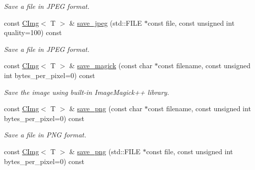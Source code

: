 \begin{DoxyCompactItemize}
\begin{DoxyCompactList}\small\item\em Save a file in JPEG format. \item\end{DoxyCompactList}\item 
\hypertarget{structcimg__library_1_1CImg_a9202a53f114a0a4231b41af4ea432bf1}{
const \hyperlink{structcimg__library_1_1CImg}{CImg}$<$ T $>$ \& \hyperlink{structcimg__library_1_1CImg_a9202a53f114a0a4231b41af4ea432bf1}{save\_\-jpeg} (std::FILE $\ast$const file, const unsigned int quality=100) const }
\label{structcimg__library_1_1CImg_a9202a53f114a0a4231b41af4ea432bf1}

\begin{DoxyCompactList}\small\item\em Save a file in JPEG format. \item\end{DoxyCompactList}\item 
\hypertarget{structcimg__library_1_1CImg_ac770a70466ad46bd7c2fd6c604974b6c}{
const \hyperlink{structcimg__library_1_1CImg}{CImg}$<$ T $>$ \& \hyperlink{structcimg__library_1_1CImg_ac770a70466ad46bd7c2fd6c604974b6c}{save\_\-magick} (const char $\ast$const filename, const unsigned int bytes\_\-per\_\-pixel=0) const }
\label{structcimg__library_1_1CImg_ac770a70466ad46bd7c2fd6c604974b6c}

\begin{DoxyCompactList}\small\item\em Save the image using built-\/in ImageMagick++ library. \item\end{DoxyCompactList}\item 
\hypertarget{structcimg__library_1_1CImg_acd1ac9bafa1dff9e3f39eedc39746bc9}{
const \hyperlink{structcimg__library_1_1CImg}{CImg}$<$ T $>$ \& \hyperlink{structcimg__library_1_1CImg_acd1ac9bafa1dff9e3f39eedc39746bc9}{save\_\-png} (const char $\ast$const filename, const unsigned int bytes\_\-per\_\-pixel=0) const }
\label{structcimg__library_1_1CImg_acd1ac9bafa1dff9e3f39eedc39746bc9}

\begin{DoxyCompactList}\small\item\em Save a file in PNG format. \item\end{DoxyCompactList}\item 
\hypertarget{structcimg__library_1_1CImg_a238d645a725ebdc2451c566a41663dc1}{
const \hyperlink{structcimg__library_1_1CImg}{CImg}$<$ T $>$ \& \hyperlink{structcimg__library_1_1CImg_a238d645a725ebdc2451c566a41663dc1}{save\_\-png} (std::FILE $\ast$const file, const unsigned int bytes\_\-per\_\-pixel=0) const }
\label{structcimg__library_1_1CImg_a238d645a725ebdc2451c566a41663dc1}


\end{DoxyCompactItemize}
